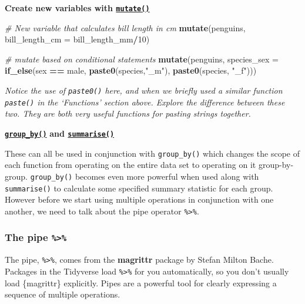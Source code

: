 \documentclass[
]{book}
\newenvironment{Shaded}{\begin{snugshade}}{\end{snugshade}}
\newcommand{\AttributeTok}[1]{\textcolor[rgb]{0.13,0.29,0.53}{#1}}
\newcommand{\CommentTok}[1]{\textcolor[rgb]{0.56,0.35,0.01}{\textit{#1}}}
\newcommand{\DecValTok}[1]{\textcolor[rgb]{0.00,0.00,0.81}{#1}}
\newcommand{\FunctionTok}[1]{\textcolor[rgb]{0.13,0.29,0.53}{\textbf{#1}}}
\newcommand{\NormalTok}[1]{#1}
\newcommand{\SpecialCharTok}[1]{\textcolor[rgb]{0.81,0.36,0.00}{\textbf{#1}}}
\newcommand{\StringTok}[1]{\textcolor[rgb]{0.31,0.60,0.02}{#1}}
\begin{document}
\textbf{Create new variables with \href{https://dplyr.tidyverse.org/reference/mutate.html}{\texttt{mutate()}}}

\begin{Shaded}
\begin{Highlighting}[]
\CommentTok{\# New variable that calculates bill length in cm}
\FunctionTok{mutate}\NormalTok{(penguins, }\AttributeTok{bill\_length\_cm =}\NormalTok{ bill\_length\_mm}\SpecialCharTok{/}\DecValTok{10}\NormalTok{)}

\CommentTok{\# mutate based on conditional statements}
\FunctionTok{mutate}\NormalTok{(penguins, }\AttributeTok{species\_sex =} \FunctionTok{if\_else}\NormalTok{(sex }\SpecialCharTok{==} \StringTok{\textquotesingle{}male\textquotesingle{}}\NormalTok{, }\FunctionTok{paste0}\NormalTok{(species,}\StringTok{"\_m"}\NormalTok{), }\FunctionTok{paste0}\NormalTok{(species, }\StringTok{"\_f"}\NormalTok{)))}
\end{Highlighting}
\end{Shaded}

\emph{Notice the use of \texttt{paste0()} here, and when we briefly used a similar function \texttt{paste()} in the `Functions' section above. Explore the difference between these two. They are both very useful functions for pasting strings together.}

\href{https://dplyr.tidyverse.org/reference/group_by.html}{\textbf{\texttt{group\_by()}}} \textbf{and \href{https://dplyr.tidyverse.org/reference/summarise.html}{\texttt{summarise()}}}

These can all be used in conjunction with \texttt{group\_by()} which changes the scope of each function from operating on the entire data set to operating on it group-by-group. \texttt{group\_by()} becomes even more powerful when used along with \texttt{summarise()} to calculate some specified summary statistic for each group. However before we start using multiple operations in conjunction with one another, we need to talk about the pipe operator \texttt{\%\textgreater{}\%}.

\hypertarget{the-pipe}{%
\subsubsection{\texorpdfstring{The pipe \texttt{\%\textgreater{}\%}}{The pipe \%\textgreater\%}}\label{the-pipe}}

The pipe, \texttt{\%\textgreater{}\%}, comes from the \textbf{magrittr} package by Stefan Milton Bache. Packages in the Tidyverse load \texttt{\%\textgreater{}\%} for you automatically, so you don't usually load \{magrittr\} explicitly. Pipes are a powerful tool for clearly expressing a sequence of multiple operations.
\end{document}
